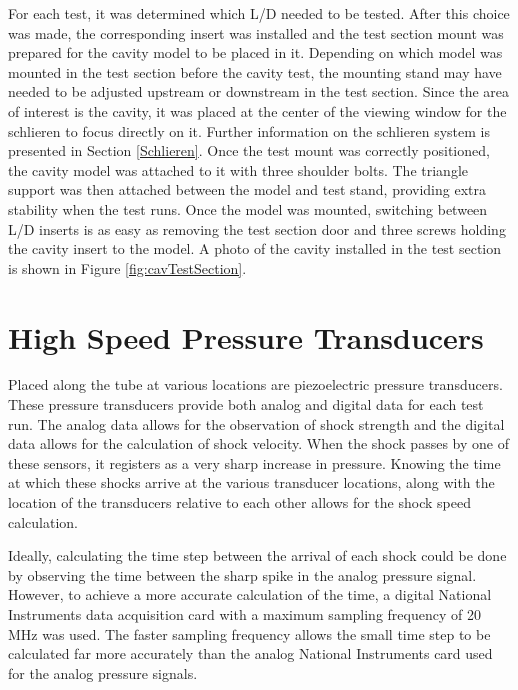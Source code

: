 For each test, it was determined which L/D needed to be tested. After this choice was made, the corresponding insert was installed and the test section mount was prepared for the cavity model to be placed in it. Depending on which model was mounted in the test section before the cavity test, the mounting stand may have needed to be adjusted upstream or downstream in the test section. Since the area of interest is the cavity, it was placed at the center of the viewing window for the schlieren to focus directly on it. Further information on the schlieren system is presented in Section \ref{Schlieren}. Once the test mount was correctly positioned, the cavity model was attached to it with three shoulder bolts. The triangle support was then attached between the model and test stand, providing extra stability when the test runs. Once the model was mounted, switching between L/D inserts is as easy as removing the test section door and three screws holding the cavity insert to the model. A photo of the cavity installed in the test section is shown in Figure \ref{fig:cavTestSection}.



\section{High Speed Pressure Transducers}

Placed along the tube at various locations are piezoelectric pressure transducers. These pressure transducers provide both analog and digital data for each test run. The analog data allows for the observation of shock strength and the digital data allows for the calculation of shock velocity. When the shock passes by one of these sensors, it registers as a very sharp increase in pressure. Knowing the time at which these shocks arrive at the various transducer locations, along with the location of the transducers relative to each other allows for the shock speed calculation. 

Ideally, calculating the time step between the arrival of each shock could be done by observing the time between the sharp spike in the analog pressure signal. However, to achieve a more accurate calculation of the time, a digital National Instruments data acquisition card with a maximum sampling frequency of 20 MHz was used. The faster sampling frequency allows the small time step to be calculated far more accurately than the analog National Instruments card used for the analog pressure signals. 

